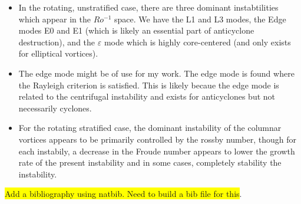 \documentclass{article}
\begin{document}
\begin{itemize}
    \item In the rotating, unstratified case, there are three dominant
    instabtilities which appear in the $Ro^{-1}$ space. We have the L1 and L3
    modes, the Edge modes E0 and E1 (which is likely an essential part of
    anticyclone destruction), and the $\varepsilon$ mode which is highly
    core-centered (and only exists for elliptical vortices).
    \item The edge mode might be of use for my work. The edge mode is found
    where the Rayleigh criterion is satisfied. This is likely becaue the edge
    mode is related to the centrifugal instability and exists for anticyclones
    but not necessarily cyclones. 
    \item For the rotating stratified case, the dominant instability of the
    columnar vortices appears to be primarily controlled by the rossby number,
    though for each instabily, a decrease in the Froude number appears to
    lower the growth rate of the present instability and in some cases,
    completely stability the instability. 
    \end{itemize}

\colorbox{yellow}{Add a bibliography using natbib. Need to build a bib file for this}. 
\end{document}
